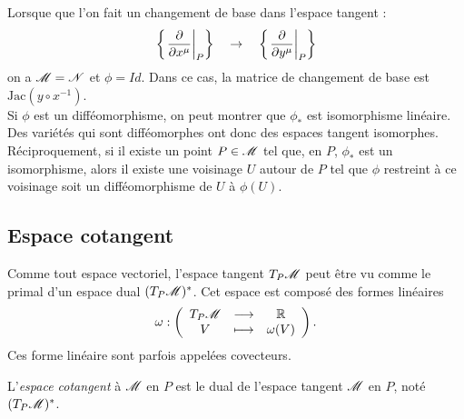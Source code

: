 \documentclass[a4paper,11pt]{report}
\begin{document}
                Lorsque que l'on fait un changement de base dans l'espace tangent : 
                \begin{equation*}
                    \left\{\eval{\pdv{}{x^\mu}}_{P}\right\}\quad\to\quad \left\{\eval{\pdv{}{y^\mu}}_P\right\}
                \end{equation*}
                on a $\mathscr{M}=\mathscr{N}$ et $\phi = Id$. Dans ce cas, la matrice de changement de base est $\text{Jac}(y\circ x^{-1})$.\\
                
                Si $\phi$ est un difféomorphisme, on peut montrer que $\phi_*$ est isomorphisme linéaire. Des variétés qui sont difféomorphes ont donc des espaces tangent isomorphes. Réciproquement, si il existe un point $P\in\mathscr{M}$ tel que, en $P$, $\phi_*$ est un isomorphisme, alors il existe une voisinage $U$ autour de $P$ tel que $\phi$ restreint à ce voisinage soit un difféomorphisme de $U$ à $\phi(U)$.
                
                
            
            \subsection{Espace cotangent}
            
                Comme tout espace vectoriel, l'espace tangent $T_P\mathscr{M}$ peut être vu comme le primal d'un espace dual $(T_P\mathscr{M})^*$. Cet espace est composé des formes linéaires
                \begin{equation}
                    \omega:\left(
                \begin{array}{ccc}
                    T_P\mathscr{M} & \longrightarrow & \mathbb{R} \\
                    V & \longmapsto & \omega(V)
                \end{array}
                \right).
                \end{equation}
                Ces forme linéaire sont parfois appelées covecteurs.
                
                \begin{defn}
                    L'\textit{espace cotangent} à $\mathscr{M}$ en $P$ est le dual de l'espace tangent $\mathscr{M}$ en $P$, noté $(T_P\mathscr{M})^*$.
                \end{defn}
                
\end{document}
